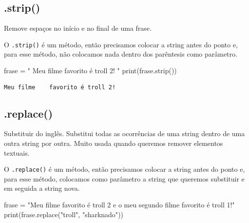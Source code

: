 \documentclass[
  letterpaper,
  DIV=11,
  numbers=noendperiod]{scrreprt}
\newenvironment{Shaded}{\begin{snugshade}}{\end{snugshade}}
\newcommand{\BuiltInTok}[1]{\textcolor[rgb]{0.00,0.23,0.31}{#1}}
\newcommand{\NormalTok}[1]{\textcolor[rgb]{0.00,0.23,0.31}{#1}}
\newcommand{\OperatorTok}[1]{\textcolor[rgb]{0.37,0.37,0.37}{#1}}
\newcommand{\StringTok}[1]{\textcolor[rgb]{0.13,0.47,0.30}{#1}}
\begin{document}
\hypertarget{strip}{%
\subsection{.strip()}\label{strip}}

Remove espaços no início e no final de uma frase.

O \texttt{.strip()} é um método, então precisamos colocar a string antes
do ponto e, para esse método, não colocamos nada dentro dos parêntesis
como parâmetro.

\begin{Shaded}
\begin{Highlighting}[]
\NormalTok{frase }\OperatorTok{=} \StringTok{"     Meu filme    favorito é troll 2!                  "}
\BuiltInTok{print}\NormalTok{(frase.strip())}
\end{Highlighting}
\end{Shaded}

\begin{tcolorbox}[enhanced jigsaw, breakable, leftrule=.75mm, left=2mm, opacityback=0, bottomrule=.15mm, toprule=.15mm, rightrule=.15mm, arc=.35mm, colback=white]

\begin{verbatim}
Meu filme    favorito é troll 2!
\end{verbatim}

\end{tcolorbox}

\hypertarget{replace}{%
\subsection{.replace()}\label{replace}}

Substituir do inglês. Substitui todas as ocorrências de uma string
dentro de uma outra string por outra. Muito usada quando queremos
remover elementos textuais.

O \texttt{.replace()} é um método, então precisamos colocar a string
antes do ponto e, para esse método, colocamos como parâmetro a string
que queremos substituir e em seguida a string nova.

\begin{Shaded}
\begin{Highlighting}[]
\NormalTok{frase }\OperatorTok{=} \StringTok{"Meu filme favorito é troll 2 e o meu segundo filme favorito é troll 1!"}
\BuiltInTok{print}\NormalTok{(frase.replace(}\StringTok{"troll"}\NormalTok{, }\StringTok{"sharknado"}\NormalTok{))}
\end{Highlighting}
\end{Shaded}
\end{document}
